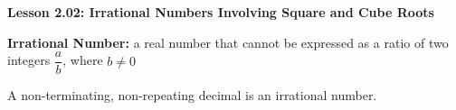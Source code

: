 \begin{center}
\textbf{Lesson 2.02: Irrational Numbers Involving Square and Cube Roots}
\end{center}

\vspace*{-1.5ex}

\textbf{Irrational Number:} a real number that cannot be expressed as a ratio of two integers \(\dfrac{a}{b}\), where \(b \ne 0\)

A non-terminating, non-repeating decimal is an irrational number.



